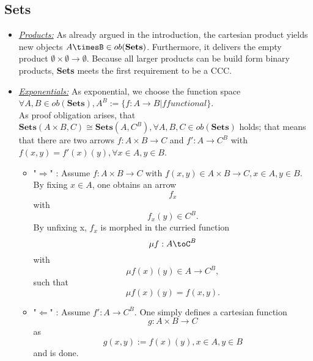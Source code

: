 \subsection{\textbf{Sets}}
\begin{itemize}
\item \underline{\textit{Products:}} As already argued in the introduction, the cartesian product yields new objects $A\timesB\in ob(\textbf{Sets})$. Furthermore, it delivers the empty product $\emptyset \times \emptyset \to \emptyset$. Because all larger products can be build form binary products, \textbf{Sets} meets the first requirement to be a CCC. 
\item  \underline{\textit{Exponentials:}} As exponential, we choose the function space $\forall A, B \in ob(\textbf{Sets}), A^B := \{ f: A \to B| f functional\}$.
  \\ As proof obligation arises, that $\textbf{Sets}(A \times B, C ) \cong \textbf{Sets}(A, C^B), \forall A,B,C \in ob(\textbf{Sets})$ holds; that means that there are two arrows $f:A \times B \to C$ and $f':A \to C^B$ with $f (x,y) = f' (x) (y), \forall x \in A, y \in B$.
  \begin{itemize}
\item "$\Rightarrow$" : Assume $f: A \times B \to C$ with $f(x,y) \in A \times B \to C, x \in A, y \in B$.
\\ By fixing $x \in A$, one obtains an arrow $$f_x$$ with $$f_x(y) \in C^B.$$ By unfixing x, $f_x$ is morphed in the curried function $$\mu f:A\toC^B$$ with $$\mu f (x)(y) \in A \to C^B,$$ such that $$\mu f(x)(y)=f(x,y).$$ 
\item "$\Leftarrow$" : Assume $f': A \to C^B$. One simply defines a cartesian function $$g: A \times B \to C$$ as $$g(x,y) := f(x)(y), x \in A, y \in B$$ and is done.
  \end{itemize}
\end{itemize}

\newpage

